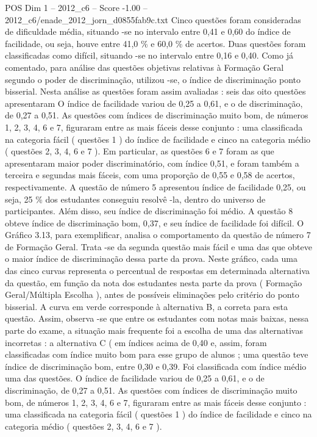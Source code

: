 \begin{textsample}{POS Dim 1 – 2012\_c6 – Score -1.00 – 2012\_c6/enade\_2012\_jorn\_d0855fab9c.txt}
Cinco questões foram consideradas de dificuldade média, situando -se no intervalo entre 0,41 e 0,60 do índice de facilidade, ou seja, houve entre 41,0 \% e 60,0 \% de acertos.
Duas questões foram classificadas como difícil, situando -se no intervalo entre 0,16 e 0,40.
Como já comentado, para análise das questões objetivas relativas à Formação Geral segundo o poder de discriminação, utilizou -se, o índice de discriminação ponto bisserial.
Nesta análise as questões foram assim avaliadas : seis das oito questões apresentaram O índice de facilidade variou de 0,25 a 0,61, e o de discriminação, de 0,27 a 0,51.
As questões com índices de discriminação muito bom, de números 1, 2, 3, 4, 6 e 7, figuraram entre as mais fáceis desse conjunto : uma classificada na categoria fácil ( questões 1 ) do índice de facilidade e cinco na categoria médio ( questões 2, 3, 4, 6 e 7 ).
Em particular, as questões 6 e 7 foram as que apresentaram maior poder discriminatório, com índice 0,51, e foram também a terceira e segundas mais fáceis, com uma proporção de 0,55 e 0,58 de acertos, respectivamente.
A questão de número 5 apresentou índice de facilidade 0,25, ou seja, 25 \% dos estudantes conseguiu resolvê -la, dentro do universo de participantes.
Além disso, seu índice de discriminação foi médio.
A questão 8 obteve índice de discriminação bom, 0,37, e seu índice de facilidade foi difícil.
O Gráfico 3.13, para exemplificar, analisa o comportamento da questão de número 7 de Formação Geral.
Trata -se da segunda questão mais fácil e uma das que obteve o maior índice de discriminação dessa parte da prova.
Neste gráfico, cada uma das cinco curvas representa o percentual de respostas em determinada alternativa da questão, em função da nota dos estudantes nesta parte da prova ( Formação Geral/Múltipla Escolha ), antes de possíveis eliminações pelo critério do ponto bisserial.
A curva em verde corresponde à alternativa B, a correta para esta questão.
Assim, observa -se que entre os estudantes com notas mais baixas, nessa parte do exame, a situação mais frequente foi a escolha de uma das alternativas incorretas : a alternativa C ( em índices acima de 0,40 e, assim, foram classificadas com índice muito bom para esse grupo de alunos ; uma questão teve índice de discriminação bom, entre 0,30 e 0,39.
Foi classificada com índice médio uma das questões.
O índice de facilidade variou de 0,25 a 0,61, e o de discriminação, de 0,27 a 0,51.
As questões com índices de discriminação muito bom, de números 1, 2, 3, 4, 6 e 7, figuraram entre as mais fáceis desse conjunto : uma classificada na categoria fácil ( questões 1 ) do índice de facilidade e cinco na categoria médio ( questões 2, 3, 4, 6 e 7 ).

\end{textsample}
